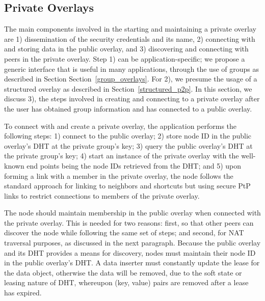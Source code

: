 \documentclass[conference]{IEEEtran}
\begin{document}
\subsection{Private Overlays}
The main components involved in the starting and maintaining a private overlay
are 1) dissemination of the security credentials and its name, 2) connecting
with and storing data in the public overlay, and 3) discovering and connecting
with peers in the private overlay.  Step 1) can be application-specific; we
propose a generic interface that is useful in many applications, through the use of groups as described in Section
Section~\ref{group_overlays}.  For 2), we presume the usage of a structured
overlay as described in Section~\ref{structured_p2p}.  In this section, we
discuss 3), the steps involved in creating and connecting to a private overlay
after the user has obtained group information and has connected to a public
overlay.

To connect with and create a private overlay, the application performs the
following steps: 1) connect to the public overlay; 2) store node ID in the
public overlay's DHT at the private group's key; 3) query the public overlay's
DHT at the private group's key; 4) start an instance of the private overlay with
the well-known end points being the node IDs retrieved from the DHT;
and 5) upon forming a link with a member in the private overlay, the node follows
the standard approach for linking to neighbors and shortcuts but using secure PtP links
to restrict connections to members of the private overlay.

The node should maintain membership in the public overlay when connected with
the private overlay.  This is needed for two reasons: first, so that other peers can discover the
node while following the same set of steps; and second, for NAT traversal purposes, as
discussed in the next paragraph.  Because the public overlay and its DHT
provides a means for discovery, nodes must maintain their node ID in the public
overlay's DHT.  A data inserter must constantly update the lease for the data
object, otherwise the data will be removed, due to the soft state or leasing
nature of DHT, whereupon (key, value) pairs are removed after a lease has expired.
\end{document}
